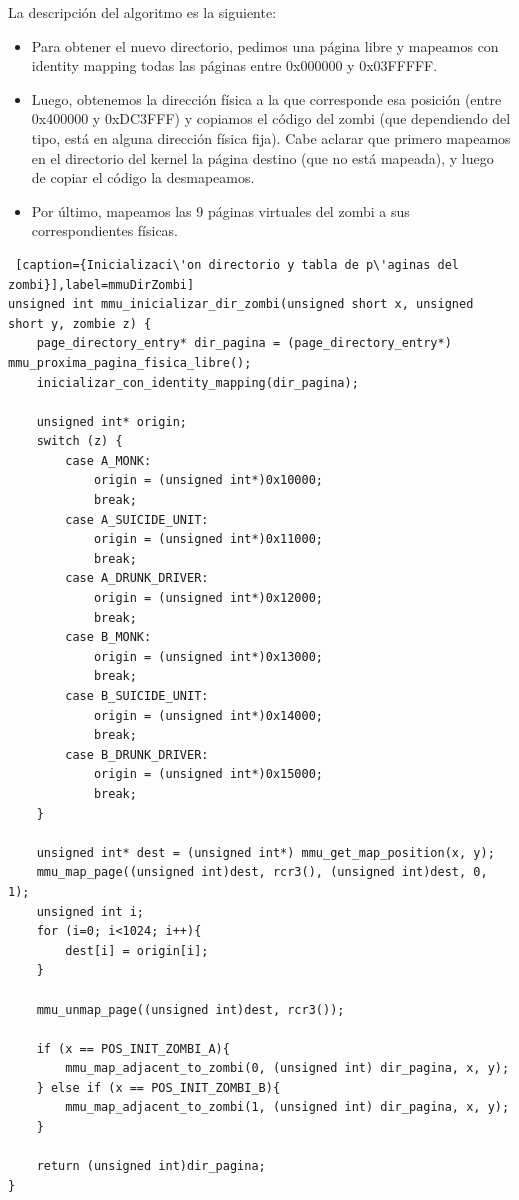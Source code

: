 \par La descripci\'on del algoritmo es la siguiente:

\begin{itemize}
\item Para obtener el nuevo directorio, pedimos una p\'agina libre y mapeamos con identity mapping todas las p\'aginas entre 0x000000 y 0x03FFFFF.
\item Luego, obtenemos la direcci\'on f\'isica a la que corresponde esa posici\'on (entre 0x400000 y 0xDC3FFF) y copiamos el c\'odigo del zombi (que dependiendo del tipo, est\'a en alguna direcci\'on f\'isica fija). Cabe aclarar que primero mapeamos en el directorio del kernel la p\'agina destino (que no est\'a mapeada), y luego de copiar el c\'odigo la desmapeamos.
\item Por \'ultimo, mapeamos las 9 p\'aginas virtuales del zombi a sus correspondientes f\'isicas.
\end{itemize}

\newpage
\begin{lstlisting} [caption={Inicializaci\'on directorio y tabla de p\'aginas del zombi}],label=mmuDirZombi] 
unsigned int mmu_inicializar_dir_zombi(unsigned short x, unsigned short y, zombie z) {
	page_directory_entry* dir_pagina = (page_directory_entry*) mmu_proxima_pagina_fisica_libre();
	inicializar_con_identity_mapping(dir_pagina);

	unsigned int* origin;
	switch (z) {
		case A_MONK:
			origin = (unsigned int*)0x10000;
			break;
        case A_SUICIDE_UNIT:
        	origin = (unsigned int*)0x11000;
        	break;
        case A_DRUNK_DRIVER:
        	origin = (unsigned int*)0x12000;
        	break;
        case B_MONK:
        	origin = (unsigned int*)0x13000;
        	break;
        case B_SUICIDE_UNIT:
        	origin = (unsigned int*)0x14000;
        	break;
        case B_DRUNK_DRIVER:
        	origin = (unsigned int*)0x15000;
        	break;
    }

	unsigned int* dest = (unsigned int*) mmu_get_map_position(x, y); 
	mmu_map_page((unsigned int)dest, rcr3(), (unsigned int)dest, 0, 1);
	unsigned int i;
	for (i=0; i<1024; i++){
		dest[i] = origin[i];
	}
	
	mmu_unmap_page((unsigned int)dest, rcr3());

	if (x == POS_INIT_ZOMBI_A){
		mmu_map_adjacent_to_zombi(0, (unsigned int) dir_pagina, x, y);
	} else if (x == POS_INIT_ZOMBI_B){
		mmu_map_adjacent_to_zombi(1, (unsigned int) dir_pagina, x, y);
	}

	return (unsigned int)dir_pagina;
}
\end{lstlisting}

